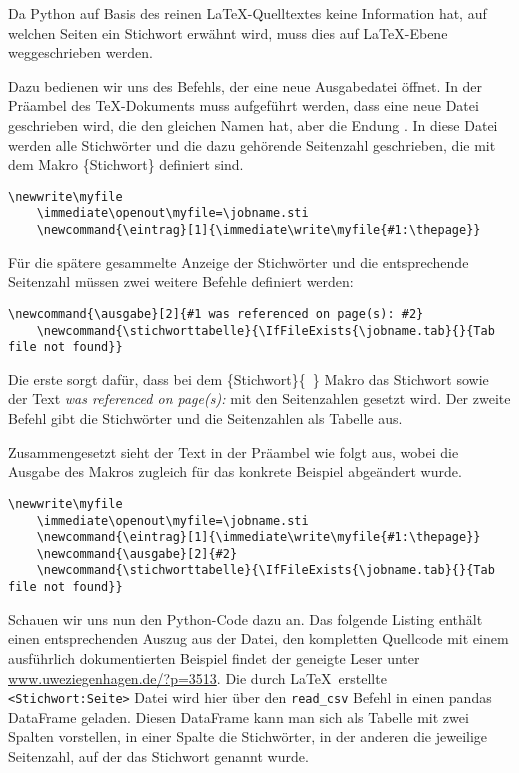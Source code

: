 \documentclass[ngerman]{dtk}
\newcommand{\eintrag}[1]{\immediate\write\myfile{#1:\thepage}}
\newcommand{\ausgabe}[2]{#2}
\newcommand{\stichworttabelle}{\IfFileExists{\jobname.tab}{}{Tab file not found}}
\begin{document}
Da Python auf Basis des reinen \LaTeX-Quelltextes keine Information hat, auf welchen Seiten ein Stichwort erwähnt wird, 
muss dies auf \LaTeX -Ebene weggeschrieben werden. 

Dazu bedienen wir uns des  Befehls, der eine neue Ausgabedatei öffnet.  In der Präambel des \TeX-Dokuments muss aufgeführt werden, dass eine neue Datei geschrieben wird, die den gleichen Namen hat, aber die Endung . In diese Datei werden alle Stichwörter und die dazu gehörende Seitenzahl geschrieben, 
die mit dem Makro \{Stichwort\}  definiert sind.
\begin{lstlisting}[style=nonumber]
	\newwrite\myfile
	\immediate\openout\myfile=\jobname.sti
	\newcommand{\eintrag}[1]{\immediate\write\myfile{#1:\thepage}}
\end{lstlisting}
Für die spätere gesammelte Anzeige der Stichwörter und die entsprechende Seitenzahl müssen zwei weitere Befehle definiert 
werden:

\begin{lstlisting}[style=nonumber]
	\newcommand{\ausgabe}[2]{#1 was referenced on page(s): #2}
	\newcommand{\stichworttabelle}{\IfFileExists{\jobname.tab}{}{Tab file not found}}
\end{lstlisting}

Die erste sorgt dafür, dass bei dem  \{Stichwort\}\{~\}  Makro das Stichwort sowie der Text 
\emph{was referenced on page(s):} mit den Seitenzahlen gesetzt wird. Der zweite Befehl gibt die Stichwörter und die Seitenzahlen als Tabelle aus.

Zusammengesetzt sieht der Text in der Präambel wie folgt aus,
wobei die Ausgabe des  Makros zugleich für das konkrete Beispiel abgeändert wurde.
\begin{lstlisting}[style=number]
	\newwrite\myfile
	\immediate\openout\myfile=\jobname.sti
	\newcommand{\eintrag}[1]{\immediate\write\myfile{#1:\thepage}}
	\newcommand{\ausgabe}[2]{#2}
	\newcommand{\stichworttabelle}{\IfFileExists{\jobname.tab}{}{Tab file not found}}
\end{lstlisting}

Schauen wir uns nun den Python-Code dazu an. Das folgende Listing enthält einen entsprechenden Auszug aus der Datei, den kompletten Quellcode mit einem ausführlich dokumentierten Beispiel findet der geneigte Leser unter \url{www.uweziegenhagen.de/?p=3513}. Die durch \LaTeX\ erstellte \texttt{<Stichwort:Seite>} Datei wird hier über den \verb|read_csv| Befehl in einen pandas DataFrame geladen. Diesen DataFrame kann man sich als Tabelle mit zwei Spalten vorstellen, in einer Spalte die Stichwörter, in der anderen die jeweilige Seitenzahl, auf der das Stichwort genannt wurde. 
\end{document}
